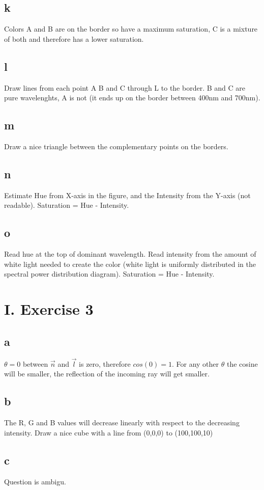 \documentclass[a4paper,11pt]{article}
\begin{document}
	\subsection*{k}
		Colors A and B are on the border so have a maximum saturation, C is a mixture of both and therefore has a lower saturation.
	\subsection*{l}
		Draw lines from each point A B and C through L to the border. B and C are pure wavelenghts, A is not (it ends up on the border between 400nm and 700nm).
	\subsection*{m}
		Draw a nice triangle between the complementary points on the borders. 
	\subsection*{n}
		Estimate Hue from X-axis in the figure, and the Intensity from the Y-axis (not readable). Saturation = Hue - Intensity.	
	\subsection*{o}
		Read hue at the top of dominant wavelength. Read intensity from the amount of white light needed to create the color (white light is uniformly distributed in the spectral power distribution diagram). Saturation = Hue - Intensity.	
		
	
	\section*{I. Exercise 3}	
	\subsection*{a}
		$\theta=0$ between $\overrightarrow{n}$ and $\overrightarrow{l}$ is zero, therefore $cos(0)=1$. For any other $\theta$ the cosine will be smaller, the reflection of the incoming ray will get smaller.
	\subsection*{b}
		The R, G and B values will decrease linearly with respect to the decreasing intensity. Draw a nice cube with a line from (0,0,0) to (100,100,10)
		
	\subsection*{c}
		Question is ambigu.
		
\end{document}
